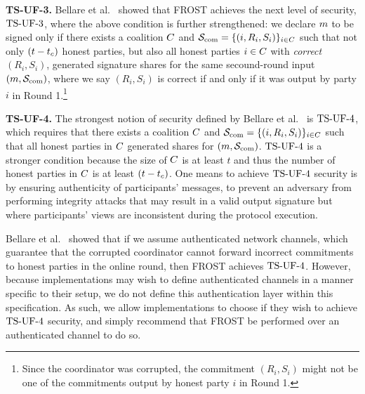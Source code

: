 \medskip

\textbf{TS-UF-3.} Bellare et al.~\cite{BellareCKMTZ22} showed that FROST achieves the next level of security, $\mathrm{TS}\mbox{-}\mathrm{UF}\mbox{-}{3}$, where the above condition is further strengthened:
we declare $m$ to be signed only if there exists  a coalition $C$ and $\mathcal{S}_{\rm com}=\{ (i, R_{i}, S_{i})\}_{i \in C}$ such that not only  $(t - t_c)$ honest parties, but also all honest parties $i\in C$ with \emph{correct} $(R_{i}, S_{i})$, generated signature shares  for the same secound-round input $(m, \mathcal{S}_{\rm com})$, where we say $(R_{i}, S_{i})$ is correct if and only if it was output by party $i$ in Round 1.\footnote{Since the coordinator was corrupted, the commitment $(R_{i}, S_{i})$ might not be one of the commitments output by honest party $i$ in Round 1.}


\medskip

\textbf{TS-UF-4.}
The strongest notion of security defined by Bellare et al.~\cite{BellareCKMTZ22} is $\mathrm{TS}\mbox{-}\mathrm{UF}\mbox{-}{4}$, which requires that there exists  a coalition $C$ and $\mathcal{S}_{\rm com}=\{ (i, R_{i}, S_{i})\}_{i \in C}$ such that all honest parties in $C$ generated shares  for $(m, \mathcal{S}_{\rm com})$.
$\mathrm{TS}\mbox{-}\mathrm{UF}\mbox{-}{4}$ is a stronger condition because the size of $C$ is at least $t$ and thus the number of honest parties in $C$ is at least  $(t - t_c)$.
One means to achieve $\mathrm{TS}\mbox{-}\mathrm{UF}\mbox{-}{4}$ security is by ensuring authenticity of participants' messages,
to prevent an adversary from performing integrity attacks that may result in a valid output signature but where participants' views are inconsistent during the protocol execution.

Bellare et al.~\cite{BellareCKMTZ22} showed that if we assume authenticated network channels, which guarantee that the corrupted coordinator cannot forward incorrect commitments to honest parties in the online round,
then FROST achieves $\mathrm{TS}\mbox{-}\mathrm{UF}\mbox{-}{4}$.
However, because implementations may wish to define authenticated channels in a manner specific to their setup,
we do not define this authentication layer within this specification.
As such,
we allow implementations to choose if they wish to achieve $\mathrm{TS}\mbox{-}\mathrm{UF}\mbox{-}{4}$ security,
and simply recommend that FROST be performed over an authenticated channel to do so.

